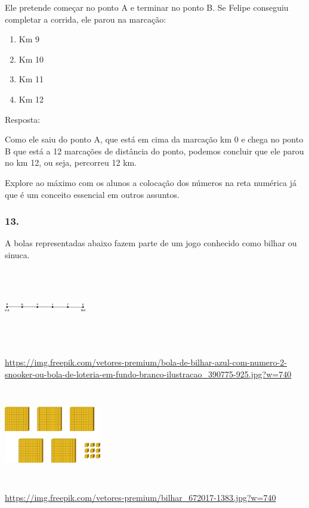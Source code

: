 Ele pretende começar no ponto A e terminar no ponto B. Se Felipe
conseguiu completar a corrida, ele parou na marcação:

\begin{enumerate}
\def\labelenumi{\alph{enumi})}
\item
  Km 9
\item
  Km 10
\item
  Km 11
\item
  Km 12
\end{enumerate}

Resposta:

Como ele saiu do ponto A, que está em cima da marcação km 0 e chega no
ponto B que está a 12 marcações de distância do ponto, podemos concluir
que ele parou no km 12, ou seja, percorreu 12 km.

Explore ao máximo com os alunos a colocação dos números na reta numérica
já que é um conceito essencial em outros assuntos.

\subsubsection{13.}\label{section-12}

A bolas representadas abaixo fazem parte de um jogo conhecido como
bilhar ou sinuca.

\includegraphics[width=1.40833in,height=1.33406in]{media/image8.png}

\url{https://img.freepik.com/vetores-premium/bola-de-bilhar-azul-com-numero-2-snooker-ou-bola-de-loteria-em-fundo-branco-ilustracao_390775-925.jpg?w=740}

\includegraphics[width=1.66667in,height=1.61877in]{media/image9.png}

\url{https://img.freepik.com/vetores-premium/bilhar_672017-1383.jpg?w=740}

